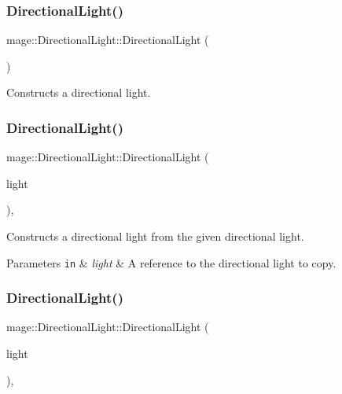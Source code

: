 \subsubsection{\texorpdfstring{Directional\+Light()}{DirectionalLight()}\hspace{0.1cm}{\footnotesize\ttfamily [1/3]}}
{\footnotesize\ttfamily mage\+::\+Directional\+Light\+::\+Directional\+Light (\begin{DoxyParamCaption}{ }\end{DoxyParamCaption})\hspace{0.3cm}{\ttfamily [noexcept]}}

Constructs a directional light. \hypertarget{classmage_1_1_directional_light_a0a89074b94178d9c3d7914d85ca5fdaa}{}\label{classmage_1_1_directional_light_a0a89074b94178d9c3d7914d85ca5fdaa} 
\subsubsection{\texorpdfstring{Directional\+Light()}{DirectionalLight()}\hspace{0.1cm}{\footnotesize\ttfamily [2/3]}}
{\footnotesize\ttfamily mage\+::\+Directional\+Light\+::\+Directional\+Light (\begin{DoxyParamCaption}\item[{const \hyperlink{classmage_1_1_directional_light}{Directional\+Light} \&}]{light }\end{DoxyParamCaption})\hspace{0.3cm}{\ttfamily [default]}, {\ttfamily [noexcept]}}

Constructs a directional light from the given directional light.


\begin{DoxyParams}[1]{Parameters}
\mbox{\tt in}  & {\em light} & A reference to the directional light to copy. \\
\hline
\end{DoxyParams}
\hypertarget{classmage_1_1_directional_light_af2871e48659e62f8b5278cc0d601a4bc}{}\label{classmage_1_1_directional_light_af2871e48659e62f8b5278cc0d601a4bc} 
\subsubsection{\texorpdfstring{Directional\+Light()}{DirectionalLight()}\hspace{0.1cm}{\footnotesize\ttfamily [3/3]}}
{\footnotesize\ttfamily mage\+::\+Directional\+Light\+::\+Directional\+Light (\begin{DoxyParamCaption}\item[{\hyperlink{classmage_1_1_directional_light}{Directional\+Light} \&\&}]{light }\end{DoxyParamCaption})\hspace{0.3cm}{\ttfamily [default]}, {\ttfamily [noexcept]}}

